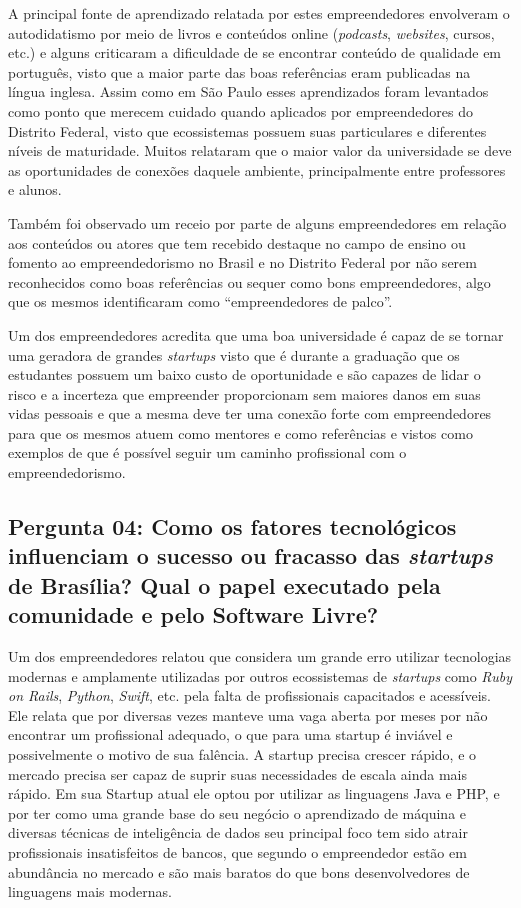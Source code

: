 A principal fonte de aprendizado relatada por estes empreendedores envolveram o autodidatismo por meio de livros e conteúdos online (\textit{podcasts}, \textit{websites}, cursos, etc.) e alguns criticaram a dificuldade de se encontrar conteúdo de qualidade em português, visto que a maior parte das boas referências eram publicadas na língua inglesa. Assim como em São Paulo esses aprendizados foram levantados como ponto que merecem cuidado quando aplicados por empreendedores do Distrito Federal, visto que ecossistemas possuem suas particulares e diferentes níveis de maturidade. Muitos relataram que o maior valor da universidade se deve as oportunidades de conexões daquele ambiente, principalmente entre professores e alunos.

Também foi observado um receio por parte de alguns empreendedores em relação aos conteúdos ou atores que tem recebido destaque no campo de ensino ou fomento ao empreendedorismo no Brasil e no Distrito Federal por não serem reconhecidos como boas referências ou sequer como bons empreendedores, algo que os mesmos identificaram como ``empreendedores de palco''.

Um dos empreendedores acredita que uma boa universidade é capaz de se tornar uma geradora de grandes \textit{startups} visto que é durante a graduação que os estudantes possuem um baixo custo de oportunidade e são capazes de lidar o risco e a incerteza que empreender proporcionam sem maiores danos em suas vidas pessoais e que a mesma deve ter uma conexão forte com empreendedores para que os mesmos atuem como mentores e como referências e vistos como exemplos de que é possível seguir um caminho profissional com o empreendedorismo.

\subsection*{Pergunta 04: Como os fatores tecnológicos influenciam o sucesso ou fracasso das \textit{startups} de Brasília? Qual o papel executado pela comunidade e pelo Software Livre?}
\label{subsection:pergunta_de_pesquisa_4}

Um dos empreendedores relatou que considera um grande erro utilizar tecnologias modernas e amplamente utilizadas por outros ecossistemas de \textit{startups} como \textit{Ruby on Rails}, \textit{Python}, \textit{Swift}, etc. pela falta de profissionais capacitados e acessíveis. Ele relata que por diversas vezes manteve uma vaga aberta por meses por não encontrar um profissional adequado, o que para uma startup é inviável e possivelmente o motivo de sua falência. A startup precisa crescer rápido, e o mercado precisa ser capaz de suprir suas necessidades de escala ainda mais rápido. Em sua Startup atual ele optou por utilizar as linguagens Java e PHP, e por ter como uma grande base do seu negócio o aprendizado de máquina e diversas técnicas de inteligência de dados seu principal foco tem sido atrair profissionais insatisfeitos de bancos, que segundo o empreendedor estão em abundância no mercado e são mais baratos do que bons desenvolvedores de linguagens mais modernas. 


